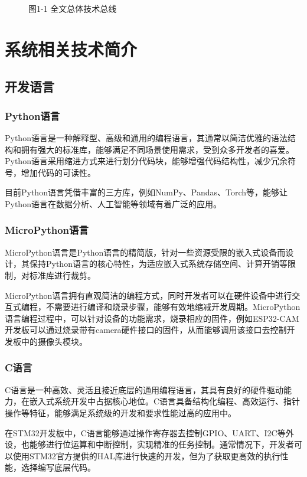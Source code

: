 \documentclass[12pt, a4paper, twoside]{ctexart}
\begin{document}
\begin{figure}[htbp]
\centering
\caption{图1-1 全文总体技术总线}
\end{figure}


\chapter{系统相关技术简介}


\section{开发语言}


\subsection{Python语言}

Python语言是一种解释型、高级和通用的编程语言，其通常以简洁优雅的语法结构和拥有强大的标准库，能够满足不同场景使用需求，受到众多开发者的喜爱。Python语言采用缩进方式来进行划分代码块，能够增强代码结构性，减少冗余符号，增加代码的可读性。

目前Python语言凭借丰富的三方库，例如NumPy、Pandas、Torch等，能够让Python语言在数据分析、人工智能等领域有着广泛的应用。


\subsection{MicroPython语言}

MicroPython语言是Python语言的精简版，针对一些资源受限的嵌入式设备而设计，其保持Python语言的核心特性，为适应嵌入式系统存储空间、计算开销等限制，对标准库进行裁剪。

MicroPython语言拥有直观简洁的编程方式，同时开发者可以在硬件设备中进行交互式编程，不需要进行编译和烧录步骤，能够有效地缩减开发周期。MicroPython语言编程过程中，可以针对设备的功能需求，烧录相应的固件，例如ESP32-CAM开发板可以通过烧录带有camera硬件接口的固件，从而能够调用该接口去控制开发板中的摄像头模块。


\subsection{C语言}

C语言是一种高效、灵活且接近底层的通用编程语言，其具有良好的硬件驱动能力，在嵌入式系统开发中占据核心地位。C语言具备结构化编程、高效运行、指针操作等特征，能够满足系统级的开发和要求性能过高的应用中。

在STM32开发板中，C语言能够通过操作寄存器去控制GPIO、UART、I2C等外设，也能够进行位运算和中断控制，实现精准的任务控制。通常情况下，开发者可以使用STM32官方提供的HAL库进行快速的开发，但为了获取更高效的执行性能，选择编写底层代码。
\end{document}
